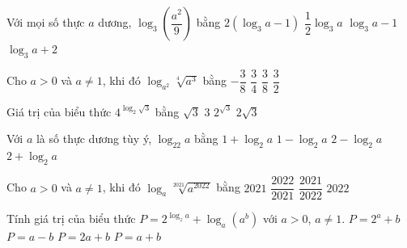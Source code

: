 \begin{ex}%
	Với mọi số thực $a$ dương, $\log_3\left(\dfrac{a^2}{9}\right)$ bằng 
	\choice 
		{\True $2(\log_3a-1)$} 
		{$\dfrac{1}{2} \log_3a$} 
		 {$\log_3a-1$}
		{$\log_3a+2$} 
\end{ex}

\begin{ex}%
	Cho $a>0$ và $a\ne 1$, khi đó  $\log_{a^2}\sqrt[4]{a^3}$ bằng
	 \choice
		{$-\dfrac{3}{8}$} 
		 {$\dfrac{3}{4}$}
		 {\True $\dfrac{3}{8}$}
		 {$\dfrac{3}{2}$}
\end{ex}

\begin{ex}%
	 Giá trị của biểu thức $4^{\log_2\sqrt 3}$ bằng
	\choice 
		{$\sqrt  3$}
		{\True $3$} 
		 {$2^{\sqrt 3}$}
		{$2\sqrt  3$}
\end{ex}

\begin{ex}%
	Với $a$ là số  thực dương tùy ý, $\log_22a$ bằng
	\choice 
		{\True $1+\log_2a$} 
		{$1-\log_2a$} 
		{$2-\log_2a$} 
		 {$2+\log_2a$}
\end{ex}

\begin{ex}%
	Cho $a>0$ và $a\ne 1$, khi đó $\log_a\sqrt[2021]{a^{2022}}$ bằng 
	 \choice
		 {$2021$}
		 {\True $\dfrac{2022}{2021}$}
		 {$\dfrac{2021}{2022}$}
		 {$2022$}
\end{ex}

\begin{ex}%
	Tính giá trị của biểu thức $P=2^{\log_{z}a}+\log_a\left(a^b\right)$ với $a>0$,  $a\ne 1$.
	\choice 
		 {$P=2^{a}+b$}
		{$P=a-b$} 
		{$P=2a+b$} 
		{\True $P=a+b$} 
\end{ex}

